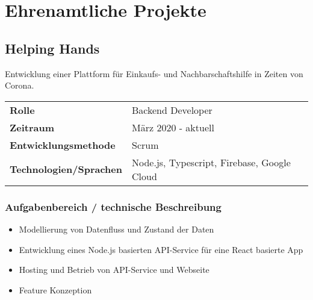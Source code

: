 \documentclass[10pt,ngerman,a4paper]{article}
\begin{document}
\section{Ehrenamtliche Projekte}
\subsection{Helping Hands}
Entwicklung einer Plattform für Einkaufs- und Nachbarschaftshilfe in Zeiten von Corona.

\begin{tabular}{ll}
\textbf{Rolle} & Backend Developer \\
\textbf{Zeitraum} & März 2020 - aktuell\\
\textbf{Entwicklungsmethode} & Scrum\\
\textbf{Technologien/Sprachen} & Node.js, Typescript, Firebase, Google Cloud\\
\end{tabular}

\subsubsection{Aufgabenbereich / technische Beschreibung}
\begin{itemize}
\item Modellierung von Datenfluss und Zustand der Daten
\item Entwicklung eines Node.js basierten API-Service für eine React basierte App
\item Hosting und Betrieb von API-Service und Webseite
\item Feature Konzeption
\end{itemize}


\end{document}
